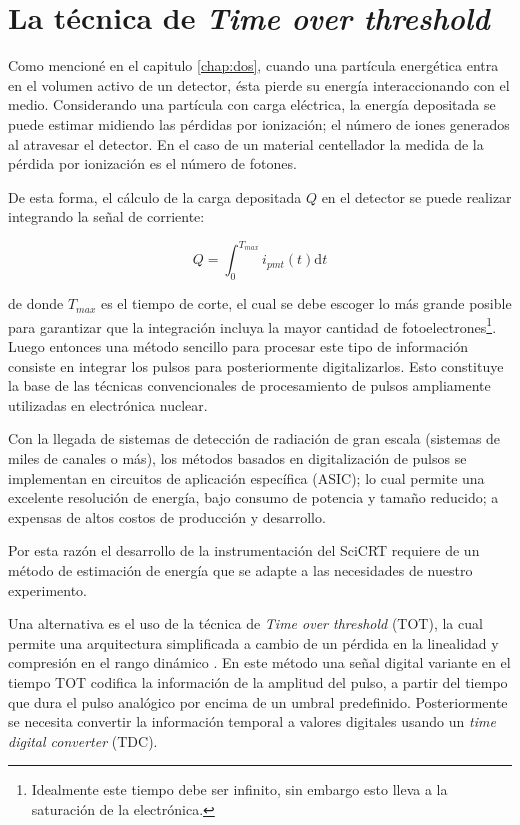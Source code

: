 \section{La técnica de \emph{Time over threshold}}
\label{sec:time-over}

Como mencioné en el capitulo \ref{chap:dos}, cuando una partícula energética entra en el volumen activo de un detector, ésta pierde su energía interaccionando con el medio. Considerando una partícula con carga eléctrica, la energía depositada se puede estimar midiendo las pérdidas por ionización; el número de iones generados al atravesar el detector. En el caso de un material centellador la medida de la pérdida por ionización es el número de fotones.

De esta forma, el cálculo de la carga depositada $Q$ en el detector se puede realizar integrando la señal de corriente:

\begin{equation}
\label{equ:charge}
Q=\int_{0}^{T_{max}} i_{pmt}\left(t\right)\mathrm{d}t
\end{equation}

de donde $T_{max}$ es el tiempo de corte, el cual se debe escoger lo más grande posible para garantizar que la integración incluya la mayor cantidad de fotoelectrones\footnote{Idealmente este tiempo debe ser infinito, sin embargo esto lleva a la saturación de la electrónica.}. Luego entonces una método sencillo para procesar este tipo de información consiste en integrar los pulsos para posteriormente digitalizarlos. Esto constituye la base de las técnicas convencionales de procesamiento de pulsos ampliamente utilizadas en electrónica nuclear.

Con la llegada de sistemas de detección de radiación de gran escala (sistemas de miles de canales o más), los métodos basados en digitalización de pulsos se implementan en circuitos de aplicación específica (ASIC); lo cual permite una excelente resolución de energía, bajo consumo de potencia y tamaño reducido; a expensas de altos costos de producción y desarrollo.

Por esta razón el desarrollo de la instrumentación del SciCRT requiere de un método de estimación de energía que se adapte a las necesidades de nuestro experimento.

Una alternativa es el uso de la técnica de \emph{Time over threshold} (TOT), la cual permite una arquitectura simplificada a cambio de un pérdida en la linealidad y compresión en el rango dinámico \cite{fujiwara10}. En este método una señal digital variante en el tiempo TOT codifica la información de la amplitud del pulso, a partir del tiempo que dura el pulso analógico por encima de un umbral predefinido. Posteriormente se necesita convertir la información temporal a valores digitales usando un \emph{time digital converter} (TDC).

